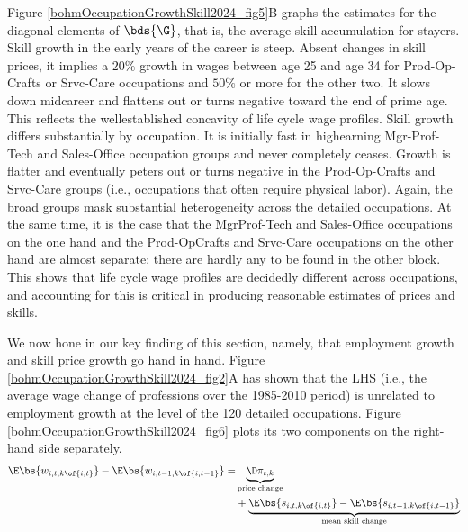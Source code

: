 \documentclass[12pt]{article}
\theoremstyle{definition}
\begin{document}
Figure \ref{bohmOccupationGrowthSkill2024_fig5}B graphs the estimates for the diagonal elements of $\bds{\G}$, that is, the average skill accumulation for stayers. Skill growth in the early years of the career is steep. Absent changes in skill prices, it implies a $20\%$ growth in wages between age 25 and age 34 for Prod-Op-Crafts or Srvc-Care occupations and $50\%$ or more for the other two. It slows down midcareer and flattens out or turns negative toward the end of prime age. This reflects the wellestablished concavity of life cycle wage profiles. Skill growth differs substantially by occupation. It is initially fast in highearning Mgr-Prof-Tech and Sales-Office occupation groups and never completely ceases. Growth is flatter and eventually peters out or turns negative in the Prod-Op-Crafts and Srvc-Care groups (i.e., occupations that often require physical labor). Again, the broad groups mask substantial heterogeneity across the detailed occupations. At the same time, it is the case that the MgrProf-Tech and Sales-Office occupations on the one hand and the Prod-OpCrafts and Srvc-Care occupations on the other hand are almost separate; there are hardly any to be found in the other block. This shows that life cycle wage profiles are decidedly different across occupations, and accounting for this is critical in producing reasonable estimates of prices and skills.

We now hone in our key finding of this section, namely, that employment growth and skill price growth go hand in hand. Figure \ref{bohmOccupationGrowthSkill2024_fig2}A has shown that the LHS (i.e., the average wage change of professions over the 1985-2010 period) is unrelated to employment growth at the level of the 120 detailed occupations. Figure \ref{bohmOccupationGrowthSkill2024_fig6} plots its two components on the right-hand side separately.
\begin{equation}
    \label{bohmOccupationGrowthSkill2024_eq8}
    \begin{aligned}
        \E\bs{w_{i, t, k\of{i,t}}} - \E\bs{w_{i, t-1, k\of{i, t-1}}} = & \underbrace{\D \pi_{t, k}}_{\text{price change}} \\
        & + \underbrace{\E\bs{s_{i, t, k\of{i,t}}} - \E\bs{s_{i, t-1, k\of{i, t-1}}}}_{\text{mean skill change}}
    \end{aligned}
\end{equation}
\end{document}
